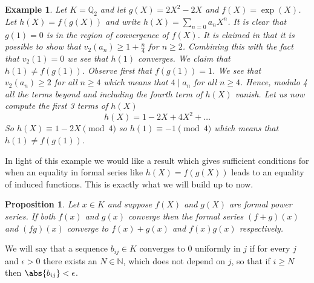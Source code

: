 \documentclass{article}
\newtheorem{proposition}{Proposition}[section]
\newtheorem{example}{Example}[section]
\newcommand{\mbb}[1]{\mathbb{#1}}
\numberwithin{equation}{section}
\begin{document}
\begin{example}\label{ex: h(X) != f(g(X))}
	Let $K = \mbb Q_2$ and let $g(X) = 2X^2 - 2X$ and $f(X) = \exp(X)$. Let $h(X) = f(g(X))$ and write $h(X) = \sum_{n = 0}a_n X^n$. It is clear that $g(1) = 0$ is in the region of convergence of $f(X)$. It is claimed in \citep[Problem 162]{gouvea} that it is possible to show that $v_2(a_n) \geq 1 + \frac{n}{4}$ for $n \geq 2$. Combining this with the fact that $v_2(1) = 0$ we see that $h(1)$ converges. We claim that $h(1) \neq f(g(1))$. Observe first that $f(g(1))= 1$. We see that $v_2(a_n) \geq 2$ for all $n \geq 4$ which means that $4 \mid a_n$ for all $n \geq 4$. Hence, modulo 4 all the terms beyond and including the fourth term of $h(X)$ vanish. Let us now compute the first 3 terms of $h(X)$
	$$h(X) = 1 - 2X + 4X^2 + \ldots$$
	So $h(X) \equiv 1 - 2X \pmod {4}$ so $h(1) \equiv -1 \pmod {4}$ which means that $h(1) \neq f(g(1))$.
\end{example}
In light of this example we would like a result which gives sufficient conditions for when an equality in formal series like $h(X) = f(g(X))$ leads to an equality of induced functions. This is exactly what we will build up to now.

\begin{proposition}\label{prop: Convergence of sum and product of power series}
	Let $x \in K$ and suppose $f(X)$ and $g(X)$ are formal power series. If both $f(x)$ and $g(x)$ converge then the formal series $(f+g)(x)$ and $(fg)(x)$ converge to $f(x) + g(x)$ and $f(x)g(x)$ respectively.
\end{proposition}
    




We will say that a sequence $b_{ij} \in K$ converges to 0 uniformly in $j$ if for every $j$ and $\epsilon > 0$ there exists an $N \in \mbb N$, which does not depend on $j$, so that if $i \geq N$ then $\abs{b_{ij}} < \epsilon$. 
\end{document}
